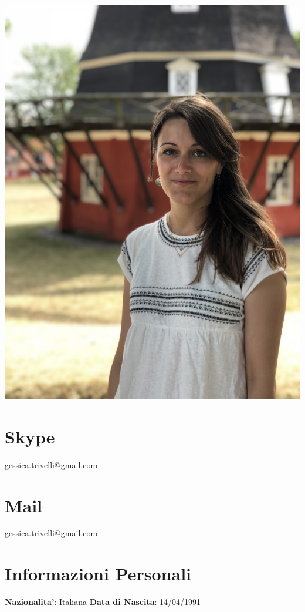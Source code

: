 \documentclass[11pt]{friggeri-cv}
\begin{document}

\begin{aside}
  \includegraphics[width=0.95\columnwidth]{img/IMG_2838}
  \section{Skype}{\footnotesize{
    gessica.trivelli@gmail.com}}
  \section{Mail}{\footnotesize{
    \href{mailto:gessica.trivelli@gmail.com}{gessica.trivelli@gmail.com}}}
  \section{Informazioni Personali}\footnotesize{
    \textbf{Nazionalita'}: 
    Italiana
    \textbf{Data di Nascita}: 14/04/1991}
\end{aside}
\end{document}
